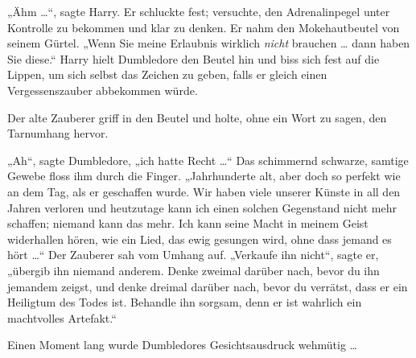 „Ähm …“, sagte Harry. Er schluckte fest; versuchte, den Adrenalinpegel unter Kontrolle zu bekommen und klar zu denken. Er nahm den Mokehautbeutel von seinem Gürtel.
„Wenn Sie meine Erlaubnis wirklich \emph{nicht} brauchen … dann haben Sie diese.“ Harry hielt Dumbledore den Beutel hin und biss sich fest auf die Lippen, um sich selbst das Zeichen zu geben, falls er gleich einen Vergessenszauber abbekommen würde.

Der alte Zauberer griff in den Beutel und holte, ohne ein Wort zu sagen, den Tarnumhang hervor.

„Ah“, sagte Dumbledore, „ich hatte Recht …“ Das schimmernd schwarze, samtige Gewebe floss ihm durch die Finger.
„Jahrhunderte alt, aber doch so perfekt wie an dem Tag, als er geschaffen wurde. Wir haben viele unserer Künste in all den Jahren verloren und heutzutage kann ich einen solchen Gegenstand nicht mehr schaffen; niemand kann das mehr. Ich kann seine Macht in meinem Geist widerhallen hören, wie ein Lied, das ewig gesungen wird, ohne dass jemand es hört …“ Der Zauberer sah vom Umhang auf.
„Verkaufe ihn nicht“, sagte er, „übergib ihn niemand anderem. Denke zweimal darüber nach, bevor du ihn jemandem zeigst, und denke dreimal darüber nach, bevor du verrätst, dass er ein Heiligtum des Todes ist. Behandle ihn sorgsam, denn er ist wahrlich ein machtvolles Artefakt.“

Einen Moment lang wurde Dumbledores Gesichtsausdruck wehmütig …

